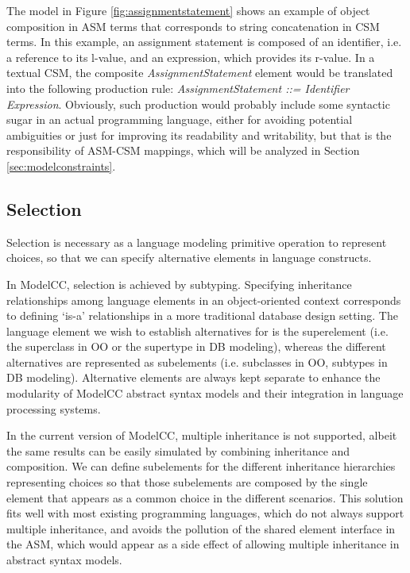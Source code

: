 \documentclass[preprint]{elsarticle}
\newcommand{\etexttt}[1]{\textit{#1}}
\begin{document}
The model in Figure \ref{fig:assignmentstatement} shows an example of object composition in ASM terms that corresponds to string concatenation in CSM terms.
In this example, an assignment statement is composed of an identifier, i.e. a reference to its l-value, and an expression, which provides its r-value.
In a textual CSM, the composite \emph{AssignmentStatement} element would be translated into the following production rule: \etexttt{AssignmentStatement ::= Identifier Expression}.
Obviously, such production would probably include some syntactic sugar in an actual programming language, either for avoiding potential ambiguities or just for improving its readability and writability, but that is the responsibility of ASM-CSM mappings, which will be analyzed in Section \ref{sec:modelconstraints}.

\subsection{Selection}

Selection is necessary as a language modeling primitive operation to represent choices, so that we can specify alternative elements in language constructs.

In ModelCC, selection is achieved by subtyping.
Specifying inheritance relationships among language elements in an object-oriented context corresponds to defining `is-a' relationships in a more traditional database design setting.
The language element we wish to establish alternatives for is the superelement (i.e. the superclass in OO or the supertype in DB modeling), whereas the different alternatives are represented as subelements (i.e. subclasses in OO, subtypes in DB modeling).
Alternative elements are always kept separate to enhance the modularity of ModelCC abstract syntax models and their integration in language processing systems.

In the current version of ModelCC, multiple inheritance is not supported, albeit the same results can be easily simulated by combining inheritance and composition.
We can define subelements for the different inheritance hierarchies representing choices so that those subelements are composed by the single element that appears as a common choice in the different scenarios.
This solution fits well with most existing programming languages, which do not always support multiple inheritance, and avoids the pollution of the shared element interface in the ASM, which would appear as a side effect of allowing multiple inheritance in abstract syntax models.
\end{document}
